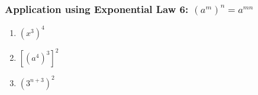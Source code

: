             \subsubsection{ Application using Exponential Law 6: ${\left({a}^{m}\right)}^{n}={a}^{mn}$ }
            \nopagebreak
        \label{m38359*id66924}\begin{enumerate}[noitemsep, label=\textbf{\arabic*}. ] 
            \label{m38359*uid36}\item 
            ${\left({x}^{3}\right)}^{4}$
      \label{m38359*uid37}\item 
        ${\left[{\left({a}^{4}\right)}^{3}\right]}^{2}$
      \label{m38359*uid38}\item 
        ${\left({3}^{n+3}\right)}^{2}$
\newline
\newline
          \end{enumerate}
\label{m38359*eip-323}\par
            \label{m38359*secfhsst!!!underscore!!!id41}\vspace{.5cm} 
      \noindent

